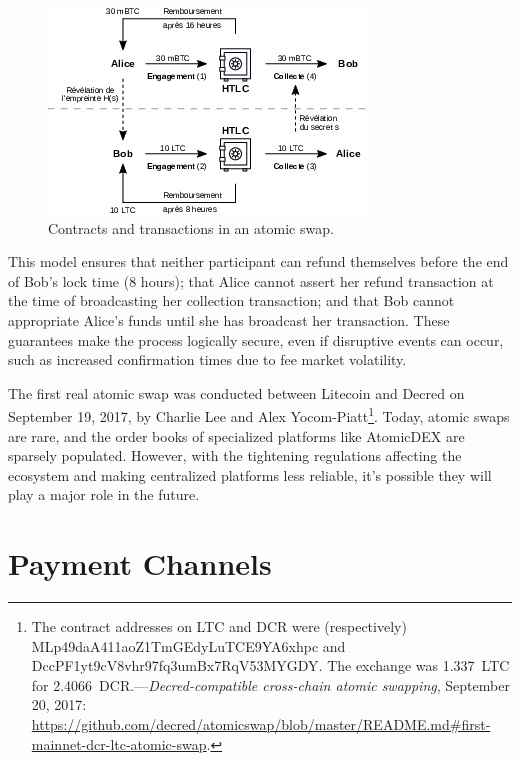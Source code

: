 \documentclass[
  a5paper,
  smalldemyvopaper,10pt,twoside,onecolumn,openright,extrafontsizes,hidelinks]{memoir}
\begin{document}
\begin{figure}

{\centering \includegraphics{chapters/img/atomic-swap-contract.png}

}

\caption{Contracts and transactions in an atomic swap.}

\end{figure}%

This model ensures that neither participant can refund themselves before
the end of Bob's lock time (8 hours); that Alice cannot assert her
refund transaction at the time of broadcasting her collection
transaction; and that Bob cannot appropriate Alice's funds until she has
broadcast her transaction. These guarantees make the process logically
secure, even if disruptive events can occur, such as increased
confirmation times due to fee market volatility.

The first real atomic swap was conducted between Litecoin and Decred on
September 19, 2017, by Charlie Lee and Alex Yocom-Piatt\footnote{The
  contract addresses on LTC and DCR were (respectively)
  MLp49daA411aoZ1TmGEdyLuTCE9YA6xhpc and
  DccPF1yt9cV8vhr97fq3umBx7RqV53MYGDY. The exchange was 1.337~LTC for
  2.4066~DCR.---\emph{Decred-compatible cross-chain atomic swapping},
  September 20, 2017:
  \url{https://github.com/decred/atomicswap/blob/master/README.md\#first-mainnet-dcr-ltc-atomic-swap}.}.
Today, atomic swaps are rare, and the order books of specialized
platforms like AtomicDEX are sparsely populated. However, with the
tightening regulations affecting the ecosystem and making centralized
platforms less reliable, it's possible they will play a major role in
the future.

\section*{Payment Channels}\label{payment-channels}
\end{document}
